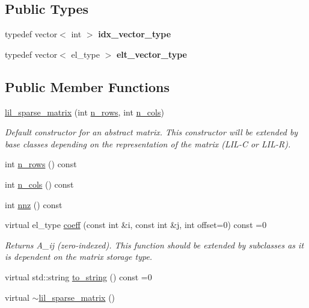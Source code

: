 \subsection*{Public Types}
\begin{DoxyCompactItemize}
\item 
typedef vector$<$ int $>$ {\bfseries idx\+\_\+vector\+\_\+type}\hypertarget{classlil__sparse__matrix_aac6d12fd87c19ad7d39f0fbdf7e0aa01}{}\label{classlil__sparse__matrix_aac6d12fd87c19ad7d39f0fbdf7e0aa01}

\item 
typedef vector$<$ el\+\_\+type $>$ {\bfseries elt\+\_\+vector\+\_\+type}\hypertarget{classlil__sparse__matrix_aac442ebc44706f184c7ce4ee7e1fdd6d}{}\label{classlil__sparse__matrix_aac442ebc44706f184c7ce4ee7e1fdd6d}

\end{DoxyCompactItemize}
\subsection*{Public Member Functions}
\begin{DoxyCompactItemize}
\item 
\hyperlink{classlil__sparse__matrix_a74dff1c9df79556341d714d4530ffe38}{lil\+\_\+sparse\+\_\+matrix} (int \hyperlink{classlil__sparse__matrix_a29e9ea5f7c8a9fca9029a91b39c592e0}{n\+\_\+rows}, int \hyperlink{classlil__sparse__matrix_ac88631204bcf7c9a223fb082a7d0cd3d}{n\+\_\+cols})\hypertarget{classlil__sparse__matrix_a74dff1c9df79556341d714d4530ffe38}{}\label{classlil__sparse__matrix_a74dff1c9df79556341d714d4530ffe38}

\begin{DoxyCompactList}\small\item\em Default constructor for an abstract matrix. This constructor will be extended by base classes depending on the representation of the matrix (L\+I\+L-\/C or L\+I\+L-\/R). \end{DoxyCompactList}\item 
int \hyperlink{classlil__sparse__matrix_a29e9ea5f7c8a9fca9029a91b39c592e0}{n\+\_\+rows} () const 
\item 
int \hyperlink{classlil__sparse__matrix_ac88631204bcf7c9a223fb082a7d0cd3d}{n\+\_\+cols} () const 
\item 
int \hyperlink{classlil__sparse__matrix_a40bc09d3b6716e57134eed0aeba49199}{nnz} () const 
\item 
virtual el\+\_\+type \hyperlink{classlil__sparse__matrix_a03af482b9f3d8c8b522dd5e49a2500ee}{coeff} (const int \&i, const int \&j, int offset=0) const =0
\begin{DoxyCompactList}\small\item\em Returns A\+\_\+ij (zero-\/indexed). This function should be extended by subclasses as it is dependent on the matrix storage type. \end{DoxyCompactList}\item 
virtual std\+::string \hyperlink{classlil__sparse__matrix_a5c2c43867660473176de5c73ebdac7be}{to\+\_\+string} () const =0
\item 
virtual \hyperlink{classlil__sparse__matrix_aebd4e61eeb73f709d0900cc064d8986d}{$\sim$lil\+\_\+sparse\+\_\+matrix} ()
\end{DoxyCompactItemize}
